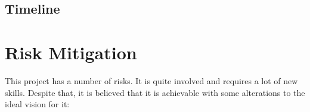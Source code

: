 \subsection{Timeline}




%
%
\section{Risk Mitigation}

    This project has a number of risks. It is quite involved and requires a lot
    of new skills. Despite that, it is believed that it is achievable with some
    alterations to the ideal vision for it:

